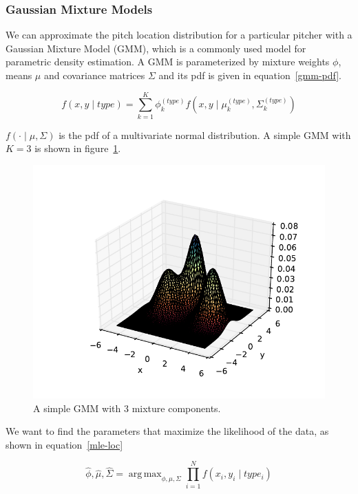 \documentclass{article}
\DeclareMathOperator*{\argmax}{arg\,max}
\begin{document}
\subsubsection{Gaussian Mixture Models} \label{gmm}

We can approximate the pitch location distribution for a particular pitcher with a Gaussian Mixture Model (GMM), which is a commonly used model for parametric density estimation.  A GMM is parameterized by mixture weights $ \phi $, means $ \mu $ and covariance matrices $ \Sigma $ and its pdf is given in equation~\ref{gmm-pdf}.

\begin{equation} \label{gmm-pdf}
f(x, y \mid type) = \sum_{k=1}^K \phi_k^{(type)} f(x,y \mid \mu_k^{(type)}, \Sigma_k^{(type)})
\end{equation}

$ f(\cdot \mid \mu, \Sigma) $ is the pdf of a multivariate normal distribution.  A simple GMM with $K=3$ is shown in figure~\ref{example-gmm}.  

\begin{figure}
\centering
\includegraphics[width=\textwidth/2]{mixture-model}
\caption{A simple GMM with 3 mixture components.}
\label{example-gmm}
\end{figure}

We want to find the parameters that maximize the likelihood of the data, as shown in equation~\ref{mle-loc}

\begin{equation} \label{mle-loc}
\hat{\phi}, \hat{\mu}, \hat{\Sigma} = \argmax_{\phi, \mu, \Sigma} \prod_{i=1}^N f(x_i, y_i \mid type_i)
\end{equation}
\end{document}
